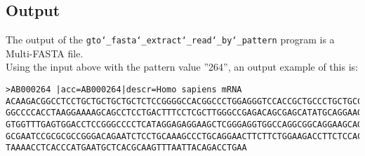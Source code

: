 \subsection*{Output}
The output of the \texttt{gto\char`_fasta\char`_extract\char`_read\char`_by\char`_pattern} program is a Multi-FASTA file.\\
Using the input above with the pattern value ''264'', an output example of this is:
\begin{lstlisting}
>AB000264 |acc=AB000264|descr=Homo sapiens mRNA 
ACAAGACGGCCTCCTGCTGCTGCTGCTCTCCGGGGCCACGGCCCTGGAGGGTCCACCGCTGCCCTGCTGCCATTGTCCCC
GGCCCCACCTAAGGAAAAGCAGCCTCCTGACTTTCCTCGCTTGGGCCGAGACAGCGAGCATATGCAGGAAGCGGCAGGAA
GTGGTTTGAGTGGACCTCCGGGCCCCTCATAGGAGAGGAAGCTCGGGAGGTGGCCAGGCGGCAGGAAGCAGGCCAGTGCC
GCGAATCCGCGCGCCGGGACAGAATCTCCTGCAAAGCCCTGCAGGAACTTCTTCTGGAAGACCTTCTCCACCCCCCCAGC
TAAAACCTCACCCATGAATGCTCACGCAAGTTTAATTACAGACCTGAA
\end{lstlisting}
